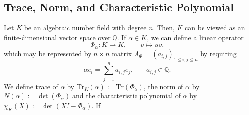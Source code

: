 \subsection{Trace, Norm, and Characteristic Polynomial}

\begin{defbox}
    \begin{definition}
        Let \(K\) be an {\color{mathif}algebraic number field} with {\color{mathif}degree} \(n\). Then, \(K\) can be viewed as an {\color{mathif}finite-dimensional vector space} over \(\mathbb{Q}\). If \(\alpha \in K\), we can define a {\color{mathif}linear operator}
        \begin{equation*}
            \Phi_\alpha: K \longrightarrow K, \qquad v \mapsto \alpha v \text{,}
        \end{equation*}
        which may be represented by \(n \times n\) {\color{mathif}matrix} \(A_\Phi = (a_{i, j})_{1 \leq i, j \leq n}\) by requiring
        \begin{equation*}
            \alpha e_i = \sum_{j=1}^n a_{i, j} e_j\text{,} \qquad a_{i, j} \in \mathbb{Q} \text{.}
        \end{equation*}
        We define {\color{maththen}trace} of \(\alpha\) by \(\mathrm{Tr}_K(\alpha) := \mathrm{Tr}(\Phi_\alpha)\), the {\color{maththen}norm} of \(\alpha\) by \(N(\alpha) := \det(\Phi_\alpha)\) and the {\color{maththen}characteristic polynomial} of \(\alpha\) by \(\chi_K(X) := \det(XI - \Phi_\alpha)\). If 
    \end{definition}
\end{defbox}

